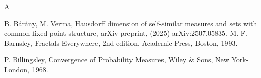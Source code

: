 \documentclass{amsproc}
\theoremstyle{definition}
\theoremstyle{remark}
\numberwithin{equation}{section}
\begin{document}

\begin{thebibliography}{A}




 B. B\'ar\'any, M. Verma, Hausdorff dimension of self-similar measures and sets with common fixed point structure, arXiv preprint, (2025) arXiv:2507.05835.
 M. F. Barnsley, Fractals Everywhere, 2nd edition, Academic Press, Boston, 1993.






 P. Billingsley, Convergence of Probability Measures, Wiley \& Sons, New York- London, 1968.


\end{thebibliography}
\end{document}
